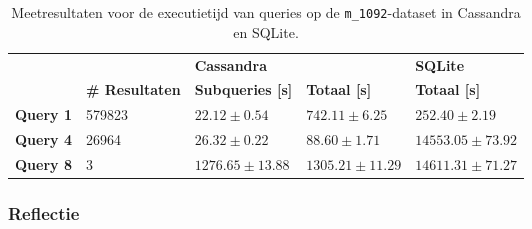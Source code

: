 \begin{table}[h]
\centering
\begin{tabular}{@{}lllll@{}}
\cmidrule(l){3-5}
                              &         & \multicolumn{2}{|l|}{\textbf{Cassandra}}                                                      & \multicolumn{1}{l|}{\textbf{SQLite}}                             \\ 
\cmidrule(l){2-5}
\multicolumn{1}{l|}{}  & \multicolumn{1}{l|}{\textbf{\# Resultaten}}               & \multicolumn{1}{l|}{\textbf{Subqueries [s]}} & \multicolumn{1}{l|}{\textbf{Totaal [s]}} & \multicolumn{1}{l|}{\textbf{Totaal [s]}} \\ \midrule
\multicolumn{1}{|l|}{\textbf{Query 1}} & \multicolumn{1}{l|}{579823} & \multicolumn{1}{l|}{$22.12 \pm 0.54$}             & \multicolumn{1}{l|}{$742.11 \pm 6.25$}          & \multicolumn{1}{l|}{$252.40 \pm 2.19$}                         \\
\multicolumn{1}{|l|}{\textbf{Query 4}} & \multicolumn{1}{l|}{26964} &\multicolumn{1}{l|}{$26.32 \pm 0.22$}            & \multicolumn{1}{l|}{$88.60 \pm 1.71$}            & \multicolumn{1}{l|}{$14553.05 \pm 73.92$}                         \\
\multicolumn{1}{|l|}{\textbf{Query 8}} & \multicolumn{1}{l|}{3} &\multicolumn{1}{l|}{$1276.65 \pm 13.88$} & \multicolumn{1}{l|}{$1305.21 \pm 11.29$}       & \multicolumn{1}{l|}{$14611.31 \pm 71.27$}                                \\ 
\bottomrule
\end{tabular}
\caption{Meetresultaten voor de executietijd van queries op de \texttt{m\_1092}-dataset in Cassandra en SQLite.}
\end{table}

\subsubsection{Reflectie}

